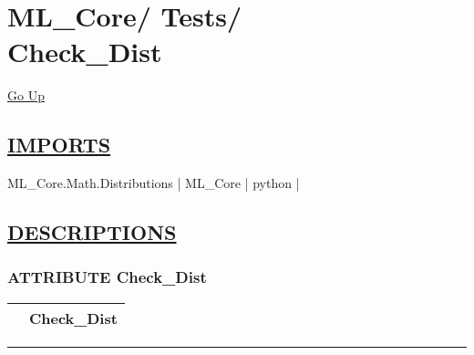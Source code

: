 \chapter*{\color{headfile}
{\large ML\_Core\slash\hspace{0pt}}
{\large Tests\slash\hspace{0pt}}
 \\
Check_Dist
}
\hypertarget{ecldoc:toc:ML_Core.Tests.Check_Dist}{}
\hyperlink{ecldoc:toc:root/ML_Core/Tests}{Go Up}

\section*{\underline{\textsf{IMPORTS}}}
\begin{doublespace}
{\large
ML\_Core.Math.Distributions |
ML\_Core |
python |
}
\end{doublespace}

\section*{\underline{\textsf{DESCRIPTIONS}}}
\subsection*{\textsf{\colorbox{headtoc}{\color{white} ATTRIBUTE}
Check\_Dist}}

\hypertarget{ecldoc:ml_core.tests.check_dist}{}

{\renewcommand{\arraystretch}{1.5}
\begin{tabularx}{\textwidth}{|>{\raggedright\arraybackslash}l|X|}
\hline
\hspace{0pt}\mytexttt{\color{red} } & \textbf{Check\_Dist} \\
\hline
\end{tabularx}
}

\par


\rule{\linewidth}{0.5pt}
